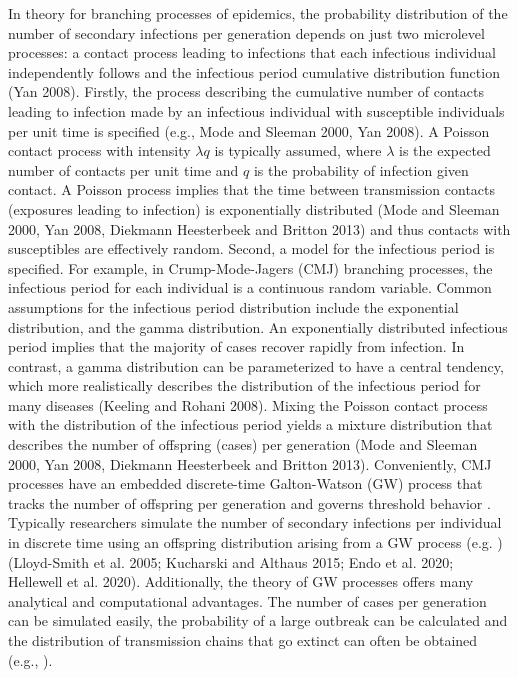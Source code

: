 \documentclass{imammb}
\numberwithin{equation}{section}
\begin{document}
In theory for branching processes of epidemics, the probability distribution of the number of secondary infections per generation depends on just two microlevel processes: a contact process leading to infections that each infectious individual independently follows and the infectious period cumulative distribution function (Yan 2008). Firstly, the process describing the cumulative number of contacts leading to infection made by an infectious individual with susceptible individuals per unit time is specified (e.g., Mode and Sleeman 2000, Yan 2008). A Poisson contact process with intensity $\lambda q$ is typically assumed, where $\lambda$ is the expected number of contacts per unit time and $q$ is the probability of infection given contact. A Poisson process implies that the time between transmission contacts (exposures leading to infection) is exponentially distributed (Mode and Sleeman 2000, Yan 2008, Diekmann Heesterbeek and Britton 2013) and thus contacts with susceptibles are effectively random. Second, a model for the infectious period is specified. For example, in Crump-Mode-Jagers (CMJ) branching processes, the infectious period for each individual is a continuous random variable. Common assumptions for the infectious period distribution include the exponential distribution, and the gamma distribution. An exponentially distributed infectious period implies that the majority of cases recover rapidly from infection. In contrast, a gamma distribution can be parameterized to have a central tendency, which more realistically describes the distribution of the infectious period for many diseases (Keeling and Rohani 2008). Mixing the Poisson contact process with the distribution of the infectious period yields a mixture distribution that describes the number of offspring (cases) per generation (Mode and Sleeman 2000, Yan 2008, Diekmann Heesterbeek and Britton 2013). Conveniently, CMJ processes have an embedded discrete-time Galton-Watson (GW) process that tracks the number of offspring per generation and governs threshold behavior \citep{Mode2000-hp}. Typically researchers simulate the number of secondary infections per individual in discrete time using an offspring distribution arising from a GW process (e.g. \citep{Lloyd-Smith2005-ma, Kucharski2015-lh, Endo2020-td, Hellewell2020-go})(Lloyd-Smith et al. 2005; Kucharski and Althaus 2015; Endo et al. 2020; Hellewell et al. 2020). Additionally, the theory of GW processes offers many analytical and computational advantages. The number of cases per generation can be simulated easily, the probability of a large outbreak can be calculated and the distribution of transmission chains that go extinct can often be obtained (e.g., \citep{Blumberg2013-xv}).
 
\end{document}
